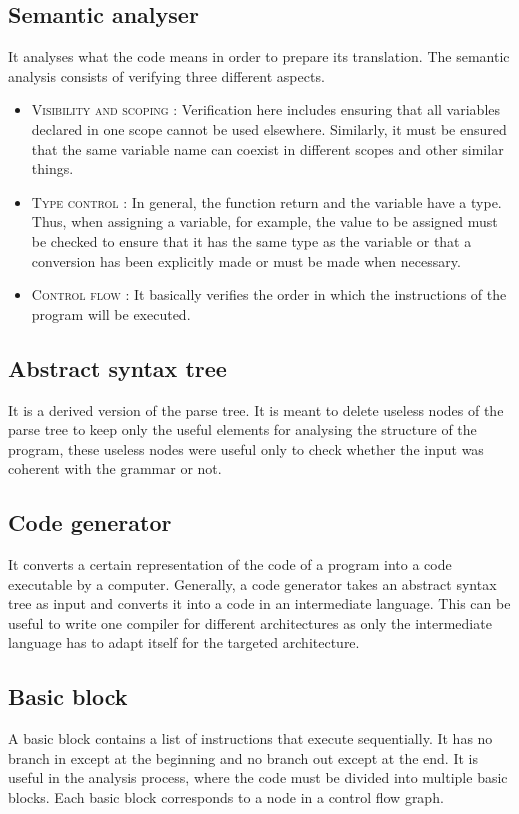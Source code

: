 \documentclass{article}
\begin{document}
\subsection{Semantic analyser}
It analyses what the code means in order to prepare its translation. The semantic analysis consists of verifying three different aspects.  
\begin{itemize}
    \item \textsc{Visibility and scoping} : Verification here includes ensuring that all variables declared in one scope cannot be used elsewhere. Similarly, it must be ensured that the same variable name can coexist in different scopes and other similar things.
    \item \textsc{Type control} : In general, the function return and the variable have a type. Thus, when assigning a variable, for example, the value to be assigned must be checked to ensure that it has the same type as the variable or that a conversion has been explicitly made or must be made when necessary.
    \item \textsc{Control flow} : It basically verifies the order in which the instructions of the program will be executed.
\end{itemize}

\subsection{Abstract syntax tree}
It is a derived version of the parse tree. It is meant to delete useless nodes of the parse tree to keep only the useful elements for analysing the structure of the program, these useless nodes were useful only to check whether the input was coherent with the grammar or not.

\subsection{Code generator}
It converts a certain representation of the code of a program into a code executable by a computer. Generally, a code generator takes an abstract syntax tree as input and converts it into a code in an intermediate language. This can be useful to write one compiler for different architectures as only the intermediate language has to adapt itself for the targeted architecture.


\subsection{Basic block}
A basic block contains a list of instructions that execute sequentially. It has no branch in except at the beginning and no branch out except at the end. It is useful in the analysis process, where the code must be divided into multiple basic blocks. Each basic block corresponds to a node in a control flow graph.
\end{document}
